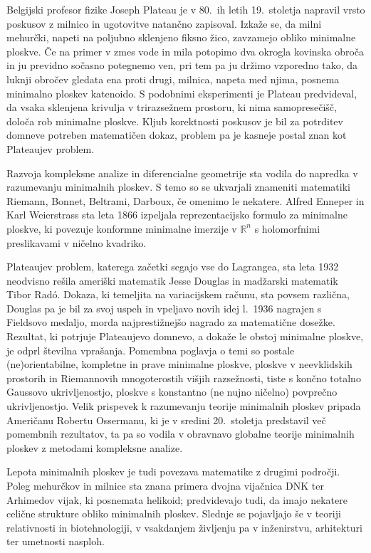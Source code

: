 \documentclass[12pt,a4paper,twoside]{article}
\theoremstyle{definition} %
\theoremstyle{plain} %
\numberwithin{equation}{section}  %
\newcommand{\R}{\mathbb R}
\begin{document}
Belgijski profesor fizike Joseph Plateau je v 80.~ih letih 19.~stoletja napravil vrsto poskusov z milnico in ugotovitve natančno zapisoval. Izkaže se, da milni mehurčki, napeti na poljubno sklenjeno fiksno žico, zavzamejo obliko minimalne ploskve. Če na primer v zmes vode in mila potopimo dva okrogla kovinska obroča in ju previdno sočasno potegnemo ven, pri tem pa ju držimo vzporedno tako, da luknji obročev gledata ena proti drugi, milnica, napeta med njima, posnema minimalno ploskev katenoido. S podobnimi eksperimenti je Plateau predvideval, da vsaka sklenjena krivulja v trirazsežnem prostoru, ki nima samopresečišč, določa rob minimalne ploskve. Kljub korektnosti poskusov je bil za potrditev domneve potreben matematičen dokaz, problem pa je kasneje postal znan kot Plateaujev problem.

Razvoja kompleksne analize in diferencialne geometrije sta vodila do napredka v razumevanju minimalnih ploskev. S temo so se ukvarjali znameniti matematiki Riemann, Bonnet, Beltrami, Darboux, če omenimo le nekatere. Alfred Enneper in Karl Weierstrass sta leta 1866 izpeljala reprezentacijsko formulo za minimalne ploskve, ki povezuje konformne minimalne imerzije v $\R^{n}$ s holomorfnimi preslikavami v ničelno kvadriko. 

Plateaujev problem, katerega začetki segajo vse do Lagrangea, sta leta 1932 neodvisno rešila ameriški matematik Jesse Douglas in madžarski matematik Tibor Rad\'o. Dokaza, ki temeljita na variacijskem računu, sta povsem različna, Douglas pa je bil za svoj uspeh in vpeljavo novih idej l.~1936 nagrajen s Fieldsovo medaljo, morda najprestižnejšo nagrado za matematične dosežke. Rezultat, ki potrjuje Plateaujevo domnevo, a dokaže le obstoj minimalne ploskve, je odprl številna vprašanja. 
Pomembna poglavja o temi so postale (ne)orientabilne, kompletne in prave minimalne ploskve, ploskve v neevklidskih prostorih in Riemannovih mnogoterostih višjih razsežnosti, tiste s končno totalno Gaussovo ukrivljenostjo, ploskve s konstantno (ne nujno ničelno) povprečno ukrivljenostjo.
Velik prispevek k razumevanju teorije minimalnih ploskev pripada Američanu Robertu Ossermanu, ki je v sredini 20.~stoletja predstavil več pomembnih rezultatov, ta pa so vodila v obravnavo globalne teorije minimalnih ploskev z metodami kompleksne analize.

Lepota minimalnih ploskev je tudi povezava matematike z drugimi področji. Poleg mehurčkov in milnice sta znana primera dvojna vijačnica DNK ter Arhimedov vijak, ki posnemata helikoid; predvidevajo tudi, da imajo nekatere celične strukture obliko minimalnih ploskev. Slednje se pojavljajo še v teoriji relativnosti in biotehnologiji, v vsakdanjem življenju pa v inženirstvu, arhitekturi ter umetnosti nasploh. \newline
\end{document}
